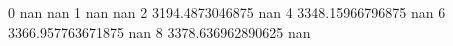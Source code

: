 0 nan nan
1 nan nan
2 3194.4873046875 nan
4 3348.15966796875 nan
6 3366.957763671875 nan
8 3378.636962890625 nan
